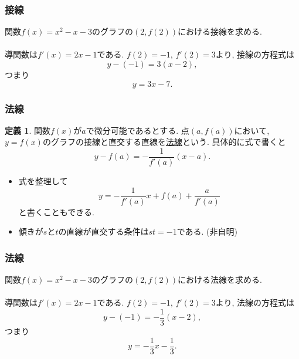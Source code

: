 \documentclass[dvipdfmx,cjk,10.2pt]{beamer}
\theoremstyle{definition}
\newtheorem{Def}[Thm]{定義}
\begin{document}





\begin{frame}
\frametitle{接線}


関数$f(x)=x^2-x-3$のグラフの$(2,f(2))$における接線を求める. \\
\ \\

導関数は$f'(x)=2x-1$である. 
$f(2)=-1$, $f'(2)=3$より, 接線の方程式は
$$
y-(-1)=3(x-2), 
$$
つまり
$$
y=3x-7. 
$$




\end{frame}






\begin{frame}
\frametitle{法線}


\begin{Def}
関数$f(x)$が$a$で微分可能であるとする. 
点$(a,f(a))$において, $y=f(x)$のグラフの接線と直交する直線を\underline{法線}という. 
具体的に式で書くと
$$
y-f(a)=-\frac{1}{f'(a)}(x-a). 
$$
\end{Def}
\begin{itemize}
\item 式を整理して
$$
y=-\frac{1}{f'(a)}x + f(a) +\frac{a}{f'(a)}
$$
と書くこともできる.  
\item 傾きが$s$と$t$の直線が直交する条件は$st=-1$である. (非自明)
\end{itemize}

\end{frame}









\begin{frame}
\frametitle{法線}


関数$f(x)=x^2-x-3$のグラフの$(2,f(2))$における法線を求める. \\
\ \\

導関数は$f'(x)=2x-1$である. 
$f(2)=-1$, $f'(2)=3$より, 法線の方程式は
$$
y-(-1)=-\frac{1}{3}(x-2), 
$$
つまり
$$
y=-\frac{1}{3}x-\frac{1}{3}.  
$$




\end{frame}
\end{document}
